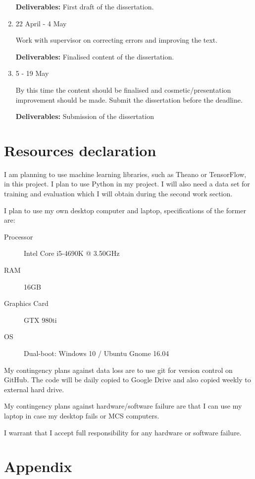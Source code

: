 \documentclass[12pt,a4paper]{article}
\begin{document}
\begin{enumerate}
\textbf{Deliverables:} First draft of the dissertation.

\item
22 April - 4 May

Work with supervisor on correcting errors and improving the text.

\textbf{Deliverables:} Finalised content of the dissertation.

\item
5 - 19 May

By this time the content should be finalised and cosmetic/presentation improvement should be made. Submit the dissertation before the deadline.

\textbf{Deliverables:} Submission of the dissertation
\end{enumerate}


\section{Resources declaration}
I am planning to use machine learning libraries, such as Theano or TensorFlow, in this project. I plan to use Python in my project. I will also need a data set for training and evaluation which I will obtain during the second work section.

I plan to use my own desktop computer and laptop, specifications of the former are:
\begin{description}
\item
[Processor] Intel Core i5-4690K @ 3.50GHz
\item
[RAM] 16GB
\item
[Graphics Card] GTX 980ti
\item
[OS] Dual-boot: Windows 10 / Ubuntu Gnome 16.04
\end{description}

My contingency plans against data loss are to use git for version control on GitHub. The code will be daily copied to Google Drive and also copied weekly to external hard drive.

My contingency plans against hardware/software failure are that I can use my laptop in case my desktop fails or MCS computers.

I warrant that I accept full responsibility for any hardware or software failure.

\section{Appendix}
\end{document}
